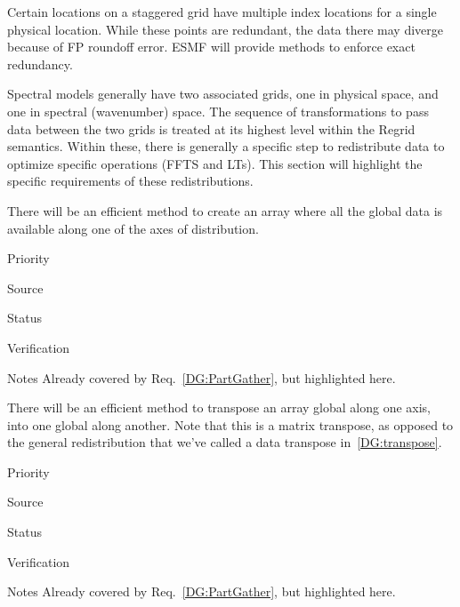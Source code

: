 
Certain locations on a staggered grid have multiple index locations
for a single physical location. While these points are redundant, the
data there may diverge because of FP roundoff error. ESMF will provide
methods to enforce exact redundancy.


Spectral models generally have two associated grids, one in physical
space, and one in spectral (wavenumber) space. The sequence of
transformations to pass data between the two grids is treated at its
highest level within the Regrid semantics. Within these, there is
generally a specific step to redistribute data to optimize specific
operations (FFTS and LTs). This section will highlight the specific
requirements of these redistributions.


There will be an efficient method to create an array where all the
global data is available along one of the axes of distribution.

\begin{reqlist}
\item[Priority]
\item[Source]
\item[Status]
\item[Verification]
\item[Notes] Already covered by Req.~\ref{DG:PartGather}, but
  highlighted here.
\end{reqlist}


There will be an efficient method to transpose an array global along
one axis, into one global along another. Note that this is a matrix
transpose, as opposed to the general redistribution that we've called
a data transpose in~\ref{DG:transpose}.

\begin{reqlist}
\item[Priority]
\item[Source]
\item[Status]
\item[Verification]
\item[Notes] Already covered by Req.~\ref{DG:PartGather}, but
  highlighted here.
\end{reqlist}



